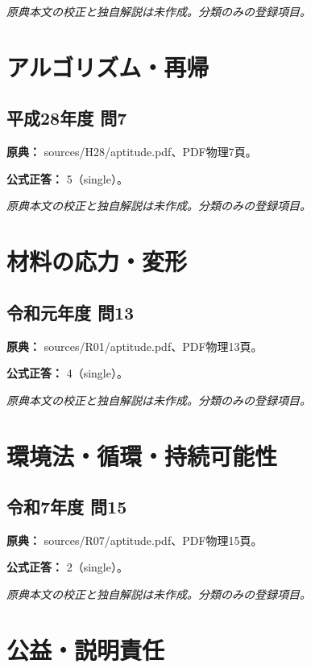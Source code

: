 \par\textit{原典本文の校正と独自解説は未作成。分類のみの登録項目。}

\section{アルゴリズム・再帰}

\subsection{平成28年度 問7}
\label{q:h28-reg-apt-07}

\noindent\textbf{原典：} sources/H28/aptitude.pdf、PDF物理7頁。

\textbf{公式正答：} 5（single）。

\par\textit{原典本文の校正と独自解説は未作成。分類のみの登録項目。}

\section{材料の応力・変形}

\subsection{令和元年度 問13}
\label{q:r01-reg-apt-13}

\noindent\textbf{原典：} sources/R01/aptitude.pdf、PDF物理13頁。

\textbf{公式正答：} 4（single）。

\par\textit{原典本文の校正と独自解説は未作成。分類のみの登録項目。}

\section{環境法・循環・持続可能性}

\subsection{令和7年度 問15}
\label{q:r07-reg-apt-15}

\noindent\textbf{原典：} sources/R07/aptitude.pdf、PDF物理15頁。

\textbf{公式正答：} 2（single）。

\par\textit{原典本文の校正と独自解説は未作成。分類のみの登録項目。}

\section{公益・説明責任}

